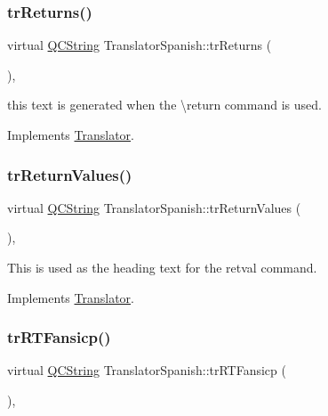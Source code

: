 \subsubsection{\texorpdfstring{trReturns()}{trReturns()}}
{\footnotesize\ttfamily virtual \mbox{\hyperlink{class_q_c_string}{Q\+C\+String}} Translator\+Spanish\+::tr\+Returns (\begin{DoxyParamCaption}{ }\end{DoxyParamCaption})\hspace{0.3cm}{\ttfamily [inline]}, {\ttfamily [virtual]}}

this text is generated when the \textbackslash{}return command is used. 

Implements \mbox{\hyperlink{class_translator}{Translator}}.

\mbox{\label{class_translator_spanish_a4979a7dc31a79e3781bf0031998ef874}} 
\subsubsection{\texorpdfstring{trReturnValues()}{trReturnValues()}}
{\footnotesize\ttfamily virtual \mbox{\hyperlink{class_q_c_string}{Q\+C\+String}} Translator\+Spanish\+::tr\+Return\+Values (\begin{DoxyParamCaption}{ }\end{DoxyParamCaption})\hspace{0.3cm}{\ttfamily [inline]}, {\ttfamily [virtual]}}

This is used as the heading text for the retval command. 

Implements \mbox{\hyperlink{class_translator}{Translator}}.

\mbox{\label{class_translator_spanish_a4495d73fa54b58e5472b60f4b4132e3e}} 
\subsubsection{\texorpdfstring{trRTFansicp()}{trRTFansicp()}}
{\footnotesize\ttfamily virtual \mbox{\hyperlink{class_q_c_string}{Q\+C\+String}} Translator\+Spanish\+::tr\+R\+T\+Fansicp (\begin{DoxyParamCaption}{ }\end{DoxyParamCaption})\hspace{0.3cm}{\ttfamily [inline]}, {\ttfamily [virtual]}}

